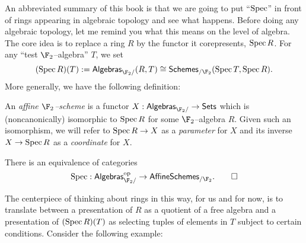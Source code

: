 An abbreviated summary of this book is that we are going to put ``$\operatorname{Spec}$'' in front of rings appearing in algebraic topology and see what happens.  Before doing any algebraic topology, let me remind you what this means on the level of algebra.  The core idea is to replace a ring $R$ by the functor it corepresents, $\operatorname{Spec} R$.  For any ``test $\F_2$--algebra'' $T$, we set \[(\Spec R)(T) := \CatOf{Algebras}_{\F_2/}(R, T) \cong \CatOf{Schemes}_{/\F_2}(\Spec T, \Spec R).\]  More generally, we have the following definition:
\begin{definition}\label{DefnAffineF2Scheme}
An \textit{affine $\F_2$--scheme} is a functor $X: \CatOf{Algebras}_{\F_2/} \to \CatOf{Sets}$ which is (noncanonically) isomorphic to $\operatorname{Spec} R$ for some $\F_2$--algebra $R$.  Given such an isomorphism, we will refer to $\operatorname{Spec} R \to X$ as a \textit{parameter} for $X$ and its inverse $X \to \operatorname{Spec} R$ as a \textit{coordinate} for $X$.
\end{definition}

\begin{lemma}
There is an equivalence of categories \[\Spec: \CatOf{Algebras}_{\F_2/}^{\mathrm{op}} \to \CatOf{AffineSchemes}_{/\F_2}. \qed\]
\end{lemma}

The centerpiece of thinking about rings in this way, for us and for now, is to translate between a presentation of $R$ as a quotient of a free algebra and a presentation of $(\operatorname{Spec} R)(T)$ as selecting tuples of elements in $T$ subject to certain conditions.  Consider the following example:

